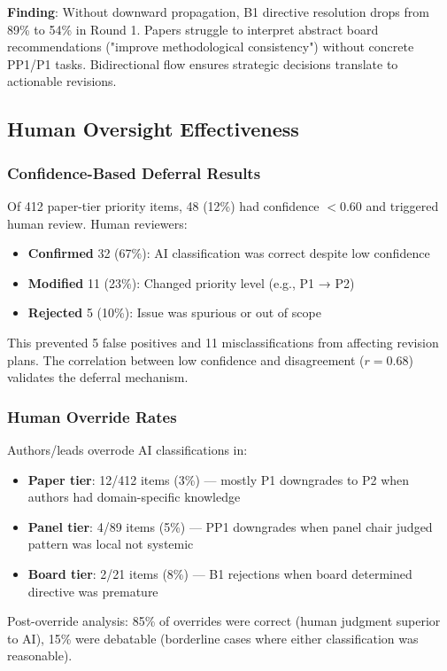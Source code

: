 \textbf{Finding}: Without downward propagation, B1 directive resolution drops from 89\% to 54\% in Round 1. Papers struggle to interpret abstract board recommendations ("improve methodological consistency") without concrete PP1/P1 tasks. Bidirectional flow ensures strategic decisions translate to actionable revisions.

\subsection{Human Oversight Effectiveness}
\label{sec:deferral-results}
\label{sec:override-results}

\subsubsection{Confidence-Based Deferral Results}

Of 412 paper-tier priority items, 48 (12\%) had confidence $< 0.60$ and triggered human review. Human reviewers:
\begin{itemize}
\item \textbf{Confirmed} 32 (67\%): AI classification was correct despite low confidence
\item \textbf{Modified} 11 (23\%): Changed priority level (e.g., P1 → P2)
\item \textbf{Rejected} 5 (10\%): Issue was spurious or out of scope
\end{itemize}

This prevented 5 false positives and 11 misclassifications from affecting revision plans. The correlation between low confidence and disagreement ($r = 0.68$) validates the deferral mechanism.

\subsubsection{Human Override Rates}

Authors/leads overrode AI classifications in:
\begin{itemize}
\item \textbf{Paper tier}: 12/412 items (3\%) — mostly P1 downgrades to P2 when authors had domain-specific knowledge
\item \textbf{Panel tier}: 4/89 items (5\%) — PP1 downgrades when panel chair judged pattern was local not systemic
\item \textbf{Board tier}: 2/21 items (8\%) — B1 rejections when board determined directive was premature
\end{itemize}

Post-override analysis: 85\% of overrides were correct (human judgment superior to AI), 15\% were debatable (borderline cases where either classification was reasonable).